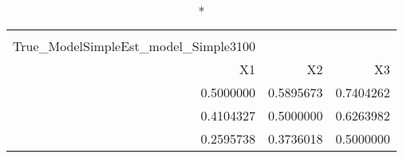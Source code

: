 \begin{longtable}{rrr}
\caption*{
{\large Pestmatrix} \\ 
{\small True\_ModelSimpleEst\_model\_Simple3100}
} \\ 
\toprule
X1 & X2 & X3 \\ 
\midrule
0.5000000 & 0.5895673 & 0.7404262 \\ 
0.4104327 & 0.5000000 & 0.6263982 \\ 
0.2595738 & 0.3736018 & 0.5000000 \\ 
\bottomrule
\end{longtable}

